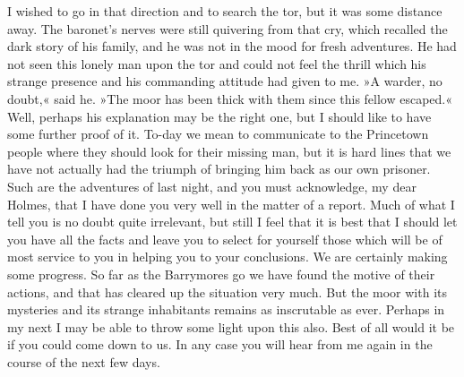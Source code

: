 I wished to go in that direction and to search the tor, but it was some distance away. The baronet's nerves were still quivering from that cry, which recalled the dark story of his family, and he was not in the mood for fresh adventures. He had not seen this lonely man upon the tor and could not feel the thrill which his strange presence and his commanding attitude had given to me. »A warder, no doubt,« said he. »The moor has been thick with them since this fellow escaped.« Well, perhaps his explanation may be the right one, but I should like to have some further proof of it. To-day we mean to communicate to the Princetown people where they should look for their missing man, but it is hard lines that we have not actually had the triumph of bringing him back as our own prisoner. Such are the adventures of last night, and you must acknowledge, my dear Holmes, that I have done you very well in the matter of a report. Much of what I tell you is no doubt quite irrelevant, but still I feel that it is best that I should let you have all the facts and leave you to select for yourself those which will be of most service to you in helping you to your conclusions. We are certainly making some progress. So far as the Barrymores go we have found the motive of their actions, and that has cleared up the situation very much. But the moor with its mysteries and its strange inhabitants remains as inscrutable as ever. Perhaps in my next I may be able to throw some light upon this also. Best of all would it be if you could come down to us. In any case you will hear from me again in the course of the next few days.

